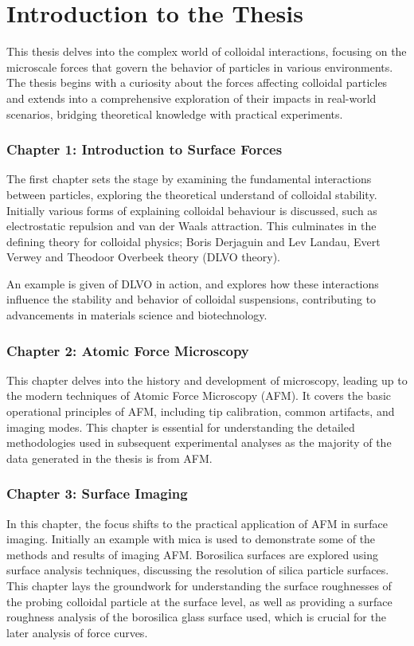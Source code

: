 \section{Introduction to the Thesis}

This thesis delves into the complex world of colloidal interactions, focusing on the microscale forces that govern the behavior of particles in various environments. The thesis begins with a curiosity about the forces affecting colloidal particles and extends into a comprehensive exploration of their impacts in real-world scenarios, bridging theoretical knowledge with practical experiments.

\subsubsection{Chapter 1: Introduction to Surface Forces}

The first chapter sets the stage by examining the fundamental interactions between particles, exploring the theoretical understand of colloidal stability. Initially various forms of explaining colloidal behaviour is discussed, such as electrostatic repulsion and van der Waals attraction. This culminates in the defining theory for colloidal physics; Boris Derjaguin and Lev Landau, Evert Verwey and Theodoor Overbeek theory (DLVO theory). 

An example is given of DLVO in action, and explores how these interactions influence the stability and behavior of colloidal suspensions, contributing to advancements in materials science and biotechnology.

\subsubsection{Chapter 2: Atomic Force Microscopy}
This chapter delves into the history and development of microscopy, leading up to the modern techniques of Atomic Force Microscopy (AFM). It covers the basic operational principles of AFM, including tip calibration, common artifacts, and imaging modes. This chapter is essential for understanding the detailed methodologies used in subsequent experimental analyses as the majority of the data generated in the thesis is from AFM.

\subsubsection{Chapter 3: Surface Imaging}
In this chapter, the focus shifts to the practical application of AFM in surface imaging. Initially an example with mica is used to demonstrate some of the methods and results of imaging AFM. Borosilica surfaces are explored using surface analysis techniques, discussing the resolution of silica particle surfaces. This chapter lays the groundwork for understanding the surface roughnesses of the probing colloidal particle at the surface level, as well as providing a surface roughness analysis of the borosilica glass surface used, which is crucial for the later analysis of force curves.

